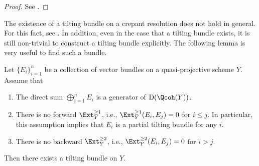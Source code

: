\begin{proof}See \cite[Lemma 3.4]{H17c}.
\end{proof}

The existence of a tilting bundle on a crepant resolution does not hold in general.
For this fact, see \cite[Theorem 4.20]{IW14b}.
In addition, even in the case that a tilting bundle exists, it is still non-trivial to construct a tilting bundle explicitly.
The following lemma is very useful to find such a bundle.

\begin{Lemma} \label{lem prelim tilting semiuniv}
Let $\{ E_i \}_{i=1}^n$ be a collection of vector bundles on a quasi-projective scheme $Y$.
Assume that
\begin{enumerate}\itemsep=0pt
\item[$(i)$] The direct sum $\bigoplus_{i=1}^n E_i$ is a generator of $\mathrm{D}(\Qcoh(Y))$.
\item[$(ii)$] There is no forward $\Ext^{\geq 1}_Y$, i.e., $\Ext_Y^{\geq 1}(E_i, E_j) = 0$ for $i \leq j$.
In particular, this assumption implies that $E_i$ is a partial tilting bundle for any $i$.
\item[$(iii)$] There is no backward $\Ext^{\geq 2}_Y$, i.e., $\Ext_Y^{\geq 2}(E_i, E_j) = 0$ for $i > j$.
\end{enumerate}
Then there exists a tilting bundle on $Y$.
\end{Lemma}

